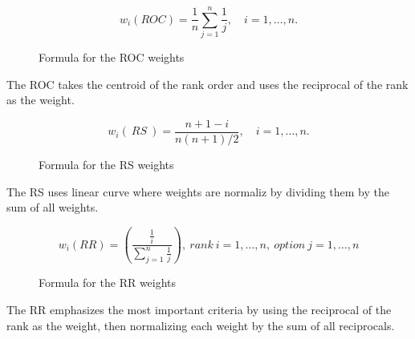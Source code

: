 \begin{figure}[h]
    \centering
    \[ w_{i}(ROC) = \frac{1}{n} \sum_{j=1}^{n} \frac{1}{j}, \quad i = 1, \ldots, n. \]
    \caption{Formula for the \ac{ROC} weights}
\end{figure}

The \ac{ROC} takes the centroid of the rank order and uses the reciprocal of the rank as the weight.

\begin{figure}[h]
    \centering
    \[ w_{i}(\ RS\ ) = \frac{n + 1 - i}{n(n + 1)/2}, \quad i = 1, \ldots, n. \]
    \caption{Formula for the \ac{RS} weights}
\end{figure}

The \ac{RS} uses linear curve where weights are normaliz by dividing them by the sum of all weights.

\begin{figure}[h]
    \centering
    \[ w_i(RR) = \left( \frac{\frac{1}{i}}{\sum_{j=1}^{n} \frac{1}{j}} \right) , \ rank\ i = 1, \ldots, n, \ option\ j = 1, \ldots, n \]
    \caption{Formula for the \ac{RR} weights}
\end{figure}

The \ac{RR} emphasizes the most important criteria by using the reciprocal of the rank as the weight, then normalizing each weight by the sum of all reciprocals.